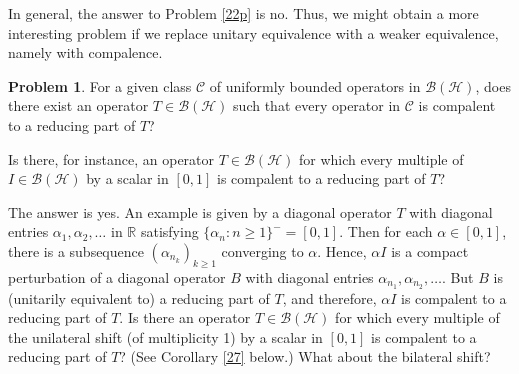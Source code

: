 \documentclass[11pt]{amsart}
\theoremstyle{definition}
\newtheorem{problem}{Problem}
\numberwithin{equation}{section}
\begin{document}
In general, the answer to Problem \ref{22p} is no. Thus, we might obtain a more interesting problem if we replace unitary equivalence with a weaker equivalence, namely
with compalence.
\begin{problem}\label{23p}
For a given class $\mathcal{C}$ of uniformly bounded operators in $\mathcal{B(H)}$, does there exist an operator $T\in\mathcal{B(H)}$ such that every operator in
$\mathcal{C}$ is compalent to a reducing part of $T$?
\end{problem}
Is there, for instance, an operator $T\in\mathcal{B(H)}$ for which every multiple of $I\in\mathcal{B(H)}$ by a scalar in $[0,1]$ is compalent to a reducing part of $T$?

The answer is yes. An example is given by a diagonal operator $T$ with diagonal entries $\alpha_{1},\alpha_{2},\ldots$ in $\mathbb{R}$ satisfying $\{\alpha_{n}:n\geq 1\}^{
-}=[0,1]$. Then for each $\alpha\in [0,1]$, there is a subsequence $(\alpha_{n_{k}})_{k\geq 1}$ converging to $\alpha$. Hence, $\alpha I$ is a compact perturbation of a
diagonal operator $B$ with diagonal entries $\alpha_{n_{1}},\alpha_{n_{2}},\ldots$. But $B$ is (unitarily equivalent to) a reducing part of $T$, and therefore, $\alpha I$
is compalent to a reducing part of $T$. Is there an operator $T\in\mathcal{B(H)}$ for which every multiple of the unilateral shift (of multiplicity 1) by a scalar in
$[0,1]$ is compalent to a reducing part of $T$? (See Corollary \ref{27} below.) What about the bilateral shift?
\end{document}
